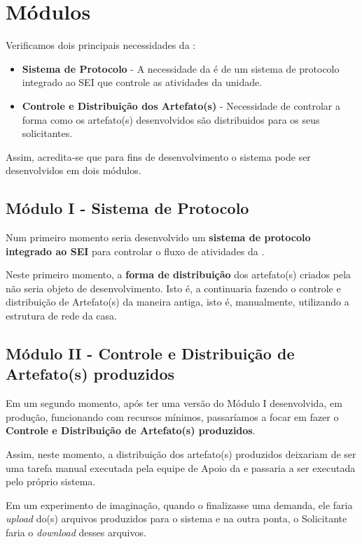 \section{Módulos}

	Verificamos dois principais necessidades da \ASSEL:
	
	\begin{itemize}
		\item  \textbf{Sistema de Protocolo} - 	A necessidade da \ASSEL \xspace é de um sistema de protocolo integrado ao SEI que controle as atividades da unidade.  
		
		\item \textbf{Controle e Distribuição dos Artefato(s)} - Necessidade de controlar a forma como os artefato(s) desenvolvidos são distribuidos para os seus solicitantes.
	\end{itemize}

	Assim, acredita-se que para fins de desenvolvimento o sistema pode ser desenvolvidos em dois módulos.

\subsection{Módulo I - Sistema de Protocolo}

	Num primeiro momento seria desenvolvido um \textbf{sistema de protocolo integrado ao SEI} para controlar o fluxo de atividades da \ASSEL.
	
	Neste primeiro momento, a \textbf{forma de distribuição} dos artefato(s) criados pela \ASSEL não seria objeto de desenvolvimento. Isto é, a \ASSEL continuaria fazendo o controle e distribuição de Artefato(s) da maneira antiga, isto é, manualmente, utilizando a estrutura de rede da casa.   


\subsection{Módulo II - Controle e Distribuição de Artefato(s) produzidos}

	Em um segundo momento, após ter uma versão do Módulo I desenvolvida, em produção, funcionando com recursos mínimos, passaríamos a focar em fazer o \textbf{Controle e Distribuição de Artefato(s) produzidos}.
	
	Assim, neste momento, a distribuição dos artefato(s) produzidos deixariam de ser uma tarefa manual executada pela equipe de Apoio da \ASSEL e passaria a ser executada pelo próprio sistema.
	
	Em um experimento de imaginação, quando o \CL finalizasse uma demanda, ele faria \emph{upload} do(s) arquivos produzidos para o sistema e na outra ponta, o Solicitante faria o \emph{download} desses arquivos.
	
